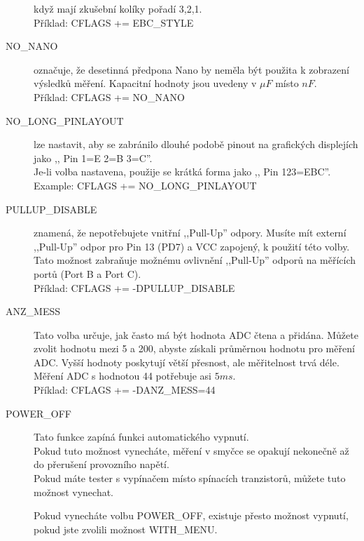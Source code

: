 \begin{description}
 když mají zkušební kolíky pořadí 3,2,1.\\
Příklad: CFLAGS += EBC\_STYLE
\vspace{-0,3cm}
  \item[NO\_NANO] označuje, že desetinná předpona Nano by neměla být použita k zobrazení výsledků měření.
Kapacitní hodnoty jsou uvedeny v \(\mu F\) místo \(nF\).\\
Příklad: CFLAGS += NO\_NANO
\vspace{-0,3cm}
  \item[NO\_LONG\_PINLAYOUT] lze nastavit, aby se zabránilo dlouhé podobě pinout na grafických displejích
jako ,, Pin  1=E 2=B 3=C''.\\
Je-li volba nastavena, použije se krátká forma jako ,, Pin  123=EBC''.\\
Example: CFLAGS += NO\_LONG\_PINLAYOUT
\vspace{-0,3cm}
  \item[PULLUP\_DISABLE] znamená, že nepotřebujete vnitřní ,,Pull-Up'' odpory.
 Musíte mít externí ,,Pull-Up'' odpor pro Pin 13 (PD7) a VCC zapojený, k použití této volby.
Tato možnost zabraňuje možnému ovlivnění ,,Pull-Up'' odporů na měřících portů (Port B a Port C).\\
Příklad: CFLAGS += -DPULLUP\_DISABLE
\vspace{-0,3cm}
  \item[ANZ\_MESS] Tato volba určuje, jak často má být hodnota ADC čtena a přidána.
Můžete zvolit hodnotu mezi 5 a 200, abyste získali průměrnou hodnotu pro měření ADC.
Vyšší hodnoty poskytují větší přesnost, ale měřitelnost trvá déle.
Měření ADC s hodnotou 44 potřebuje asi \(5ms\).\\
Příklad: CFLAGS += -DANZ\_MESS=44
\vspace{-0,3cm}
  \item[POWER\_OFF] Tato funkce zapíná funkci automatického vypnutí.\\
Pokud tuto možnost vynecháte, měření v smyčce se opakují nekonečně až do přerušení provozního napětí.\\
Pokud máte tester s vypínačem místo spínacích tranzistorů, můžete tuto možnost vynechat.

Pokud vynecháte volbu POWER\_OFF, existuje přesto možnost vypnutí, pokud jste zvolili možnost WITH\_MENU.


\end{description}
